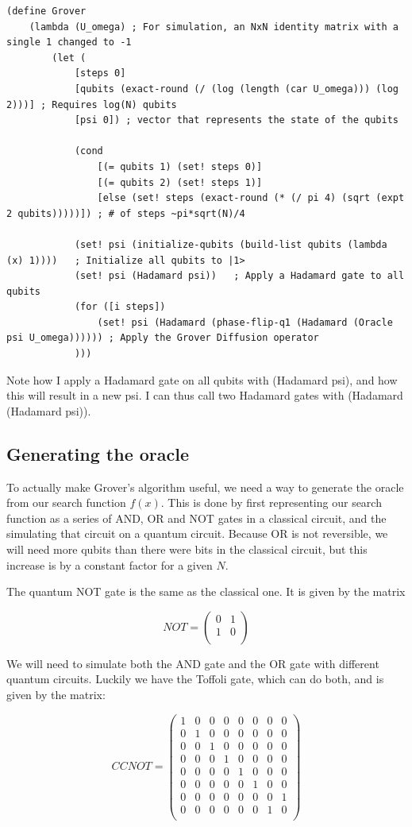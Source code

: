\documentclass[11pt]{article}
\begin{document}
\begin{lstlisting}
(define Grover
	(lambda (U_omega) ; For simulation, an NxN identity matrix with a single 1 changed to -1
		(let (
			[steps 0]
			[qubits (exact-round (/ (log (length (car U_omega))) (log 2)))] ; Requires log(N) qubits
			[psi 0]) ; vector that represents the state of the qubits

			(cond
				[(= qubits 1) (set! steps 0)]
				[(= qubits 2) (set! steps 1)]
				[else (set! steps (exact-round (* (/ pi 4) (sqrt (expt 2 qubits)))))]) ; # of steps ~pi*sqrt(N)/4

			(set! psi (initialize-qubits (build-list qubits (lambda (x) 1))))	; Initialize all qubits to |1>
			(set! psi (Hadamard psi))	; Apply a Hadamard gate to all qubits
			(for ([i steps])
				(set! psi (Hadamard (phase-flip-q1 (Hadamard (Oracle psi U_omega)))))) ; Apply the Grover Diffusion operator
			)))
\end{lstlisting}

Note how I apply a Hadamard gate on all qubits with (Hadamard psi), and how this will result in a new psi. I can thus call two Hadamard gates with (Hadamard (Hadamard psi)).

\subsection{Generating the oracle}

To actually make Grover's algorithm useful, we need a way to generate the oracle from our search function $f(x)$. This is done by first representing our search function as a series of AND, OR and NOT gates in a classical circuit, and the simulating that circuit on a quantum circuit. Because OR is not reversible, we will need more qubits than there were bits in the classical circuit, but this increase is by a constant factor for a given $N$.

The quantum NOT gate is the same as the classical one. It is given by the matrix

$$NOT= \begin{pmatrix}
0 & 1 \\
1 & 0 \\
\end{pmatrix}$$

We will need to simulate both the AND gate and the OR gate with different quantum circuits. Luckily we have the Toffoli gate, which can do both, and is given by the matrix:

$$CCNOT= \begin{pmatrix}
1 & 0 & 0 & 0 & 0 & 0 & 0 & 0 \\
0 & 1 & 0 & 0 & 0 & 0 & 0 & 0 \\
0 & 0 & 1 & 0 & 0 & 0 & 0 & 0 \\
0 & 0 & 0 & 1 & 0 & 0 & 0 & 0 \\
0 & 0 & 0 & 0 & 1 & 0 & 0 & 0 \\
0 & 0 & 0 & 0 & 0 & 1 & 0 & 0 \\
0 & 0 & 0 & 0 & 0 & 0 & 0 & 1 \\
0 & 0 & 0 & 0 & 0 & 0 & 1 & 0 \\
\end{pmatrix}$$
\end{document}
